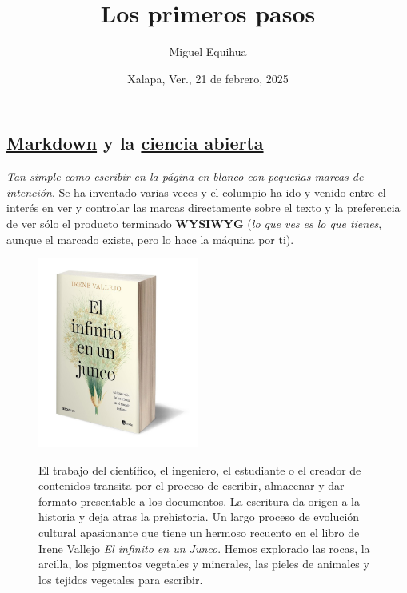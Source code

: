 \documentclass[
  letterpaper,
  DIV=11,
  numbers=noendperiod]{scrartcl}
\title{Los primeros pasos}
\author{Miguel Equihua}
\date{Xalapa, Ver., 21 de febrero, 2025}
\begin{document}
\maketitle

\subsection{\texorpdfstring{\href{https://rstudio.github.io/cheatsheets/quarto.pdf}{Markdown}
y la \href{pres-ciencia-abierta.qmd}{ciencia
abierta}}{Markdown y la ciencia abierta}}\label{markdown-y-la-ciencia-abierta}

\emph{Tan simple como escribir en la página en blanco con pequeñas
marcas de intención}. Se ha inventado varias veces y el columpio ha ido
y venido entre el interés en ver y controlar las marcas directamente
sobre el texto y la preferencia de ver sólo el producto terminado
\textbf{WYSIWYG} (\emph{lo que ves es lo que tienes}, aunque el marcado
existe, pero lo hace la máquina por ti).

\begin{figure}

\begin{minipage}{0.40\linewidth}
\includegraphics[width=2.08333in,height=\textheight]{images/900-el-infinito-en-un-junco-irene-vallejo-alfa.png}\end{minipage}%
%
\begin{minipage}{0.60\linewidth}
El trabajo del científico, el ingeniero, el estudiante o el creador de
contenidos transita por el proceso de escribir, almacenar y dar formato
presentable a los documentos. La escritura da origen a la historia y
deja atras la prehistoria. Un largo proceso de evolución cultural
apasionante que tiene un hermoso recuento en el libro de Irene Vallejo
\emph{El infinito en un Junco}. Hemos explorado las rocas, la arcilla,
los pigmentos vegetales y minerales, las pieles de animales y los
tejidos vegetales para escribir.\end{minipage}%

\end{figure}%
\end{document}
